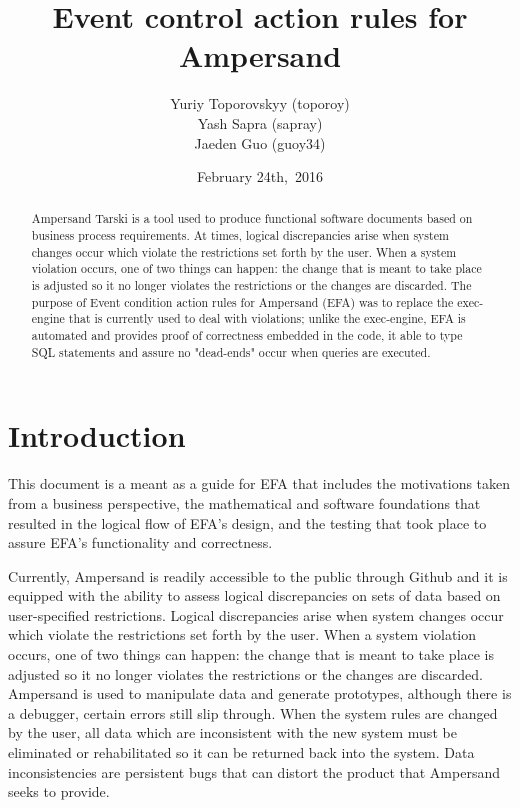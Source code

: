 \documentclass[journal,12pt,onecolumn,draftclsnofoot]{IEEEtran} %
\title{\vspace*{3cm} Event control action rules for Ampersand}
\author{Yuriy Toporovskyy (toporoy)\\ Yash Sapra (sapray) \\ Jaeden Guo 
    (guoy34)}
\date{February 24th,\ 2016}
\begin{document}
\maketitle
\newpage


\begin{abstract}
Ampersand Tarski is a tool used to produce functional software documents based 
on business process requirements. At times, logical 
discrepancies arise when system changes occur which violate the 
restrictions set forth by the user. When a system violation occurs, one of two 
things can happen: the change that is meant to take place is adjusted so it no 
longer violates the restrictions or the changes are discarded. The purpose of 
Event condition action rules for Ampersand (EFA) was to replace the exec-engine 
that is currently used to deal with violations; unlike the exec-engine, EFA is 
automated and provides proof of correctness embedded in the code, it able to 
type SQL statements and assure no "dead-ends" occur when queries are executed.
\end{abstract}
\newpage
\tableofcontents
\newpage
\newpage
\section{Introduction}\label{Intro}

This document is a meant as a guide for EFA that includes the motivations taken 
from a business perspective, the mathematical and software foundations that 
resulted in the logical flow of EFA's design, and the testing that took place 
to assure EFA's functionality and correctness.

Currently, Ampersand is readily accessible to the public through Github and it 
is equipped with the ability to assess logical 
discrepancies on sets of data based on user-specified restrictions. Logical 
discrepancies arise when system changes occur which violate the 
restrictions set forth by the user. When a system violation occurs, one of two 
things can happen: the change that is meant to take place is adjusted so it no 
longer violates the restrictions or the changes are discarded. Ampersand is 
used to manipulate data and generate prototypes, although there is a debugger, 
certain errors still slip through. When the system rules are changed by the 
user, all data which are inconsistent with the new system must be eliminated or 
rehabilitated so it can be returned back into the system. Data inconsistencies 
are persistent bugs that can distort the product that Ampersand seeks to 
provide. 
\end{document}
